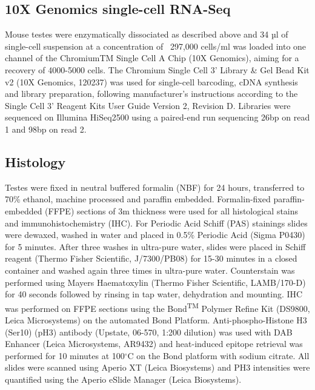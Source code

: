 \subsection{10X Genomics single-cell RNA-Seq}

Mouse testes were enzymatically dissociated as described above and 34 µl of single-cell suspension at a concentration of ~297,000 cells/ml was loaded into one channel of the ChromiumTM Single Cell A Chip (10X Genomics\textsuperscript{\textregistered}), aiming for a recovery of 4000-5000 cells. 
The Chromium Single Cell 3’ Library \& Gel Bead Kit v2 (10X Genomics\textsuperscript{\textregistered}, 120237) was used for single-cell barcoding, cDNA synthesis and library preparation, following manufacturer’s instructions according to the Single Cell 3’ Reagent Kits User Guide Version 2, Revision D. 
Libraries were sequenced on Illumina HiSeq2500 using a paired-end run sequencing 26bp on read 1 and 98bp on read 2. 

\subsection{Histology}
Testes were fixed in neutral buffered formalin (NBF) for 24 hours, transferred to 70\% ethanol, machine processed and paraffin embedded. 
Formalin-fixed paraffin-embedded (FFPE) sections of 3\textmu{}m thickness were used for all histological stains and immunohistochemistry (IHC). 
For Periodic Acid Schiff (PAS) stainings slides were dewaxed, washed in water and placed in 0.5\% Periodic Acid (Sigma P0430) for 5 minutes. After three washes in ultra-pure water, slides were placed in Schiff reagent (Thermo Fisher Scientific, J/7300/PB08) for 15-30 minutes in a closed container and washed again three times in ultra-pure water. 
Counterstain was performed using Mayers Haematoxylin (Thermo Fisher Scientific, LAMB/170-D) for 40 seconds followed by rinsing in tap water, dehydration and mounting. IHC was performed on FFPE sections using the Bond\textsuperscript{TM} Polymer Refine Kit (DS9800, Leica Microsystems) on the automated Bond Platform. Anti-phospho-Histone H3 (Ser10) (pH3) antibody (Upstate, 06-570, 1:200 dilution) was used with DAB Enhancer (Leica Microsystems, AR9432) and heat-induced epitope retrieval was performed for 10 minutes at 100$^\circ$C on the Bond platform with sodium citrate. 
All slides were scanned using Aperio XT (Leica Biosystems) and PH3 intensities were quantified using the Aperio eSlide Manager (Leica Biosystems). 

\newpage

